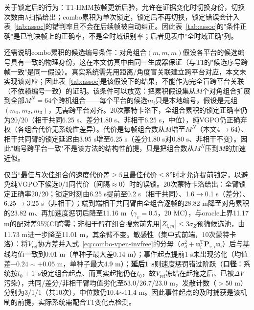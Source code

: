 \documentclass[UTF8,a4paper,zihao=-4]{ctexart}
\begin{document}
关于锁定后的行为：T1-HMM按帧更新后验，允许在证据变化时切换身份，切换次数由\(\lambda\)扫描给出；combo累积为单次锁定，锁定后不再切换，锁定错误会计入表~\ref{tab:assoc}的错判率且不会在后续帧被自动纠正。因此表~\ref{tab:assoc}的"条件正确"是已判决帧上的正确率，不是全时域识别率；后者见表中"全时域正确"列。

还需说明combo累积的候选编号条件：对角组合\((m,m,m)\)假设各平台的候选编号具有一致的物理身份，这在本文仿真中由同一生成器保证（与T1的"候选序号跨帧一致"是同一假设）。真实系统需先用距离/角度盲关联建立跨平台对应，本文未实现该对应；因此表~\ref{tab:assoc}是该假设下的结果，不能作为完全盲跨平台关联（不依赖编号一致）的证明。该条件可以放宽：把累积假设集从\(M\)个对角组合扩展到全部\(M^N=64\)个跨机组合——每个平台的候选\(m_i\)只是本地编号，假设是元组\((m_1,m_2,m_3)\)，无需跨平台对齐。20次蒙特卡洛下，全组合累积的锁定正确率仍为20/20（相干共同6.25 s、差分1.80 s、非相干6.25 s，中位），纯VGPO仍正确弃权（各组合代价无系统性差异）。代价是每帧组合数从\(M\)增至\(M^N\)（本文4\(\to\)64）、相干共同臂的锁定延迟由3.95 s增至6.25 s（差分1.80 s对0.80 s、非相干不变）。因此"编号跨平台一致"不是该方法的结构性前提，只是把组合数从\(M^N\)压到\(M\)的加速近似。



仅当“最佳与次佳组合的速度代价差\(\ge5\)且最佳代价\(\le8\)”时才允许提前锁定，以避免纯VGPO下候选0/1同代价（间隔\(\approx0\)）时的误锁。20次蒙特卡洛给出：全臂锁定正确率20/20；锁定时刻由6.25 s提前至0.2 s（相干共同）、1.6\(\to\)0.1 s（差分）、6.25\(\to\)3.25 s（非相干）；端到端相干共同臂由全组合逐帧的28.82 m降至对角累积的23.82 m、再加速度惩罚后降至11.16 m（\(\gamma_v=0.5\)，20 MC），与oracle上界11.17 m的配对差95\%CI跨零；非相干臂在组合搜索前先用\(|Z_{i,m}|\le3\sigma_Z\)预筛候选池，由11.73 m进一步降至11.01 m，其余臂不变。敏感性（集中式前端，10次蒙特卡洛）：将\(V_{\mathrm{ref}}\)协方差并入式~\eqref{eq:combo-vpen-invfree}的分母（\(\sigma_d^2+\boldsymbol u_i^{\mathrm T}\boldsymbol P_{v,i}\boldsymbol u_i\)）后与基线均值一致到0.01 m（单种子最大差0.14 m）；事件起点提前1 s未出现劣化（均值差$-0.24\sim+0.05$ m，单种子最大4.9 m）；\textbf{延后1 s}则速度惩罚错过阶跃（\textbf{口径}：系统按\(t_0+1\)~s设定组合起点、而真实起拖仍在\(t_0\)，故\(V_{\mathrm{ref}}\)冻结在起拖之后、已被\(\Delta V\)污染），共同/差分/非相干臂均值劣化至53.0/26.7/23.0 m，发散计数（$>50$ m）分别为3/1/1（共10次），中位数仍10.4$\sim$11.4 m。因此事件起点的及时捕获是该机制的前提，实际系统需配合T1变化点检测。
\end{document}
